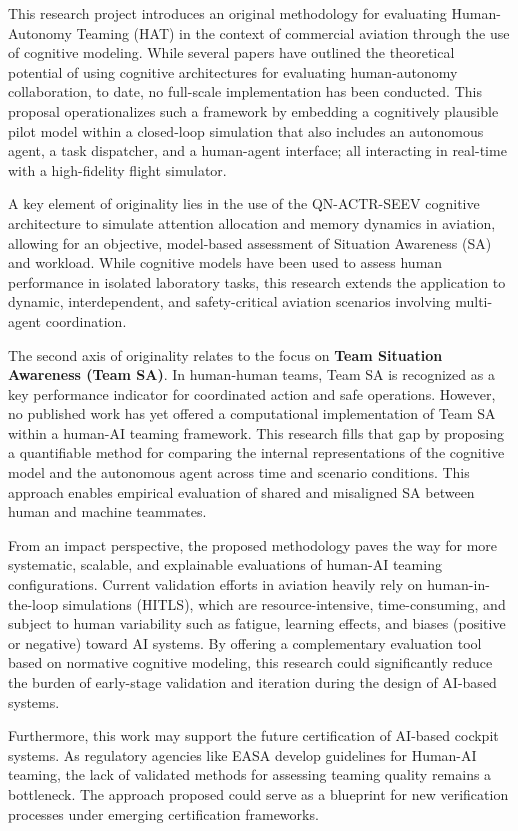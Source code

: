 \documentclass[12pt,a4paper]{article} %
\begin{document}
	This research project introduces an original methodology for evaluating Human-Autonomy Teaming (HAT) in the context of commercial aviation through the use of cognitive modeling. While several papers have outlined the theoretical potential of using cognitive architectures for evaluating human-autonomy collaboration, to date, no full-scale implementation has been conducted. This proposal operationalizes such a framework by embedding a cognitively plausible pilot model within a closed-loop simulation that also includes an autonomous agent, a task dispatcher, and a human-agent interface; all interacting in real-time with a high-fidelity flight simulator.
	
	A key element of originality lies in the use of the QN-ACTR-SEEV cognitive architecture to simulate attention allocation and memory dynamics in aviation, allowing for an objective, model-based assessment of Situation Awareness (SA) and workload. While cognitive models have been used to assess human performance in isolated laboratory tasks, this research extends the application to dynamic, interdependent, and safety-critical aviation scenarios involving multi-agent coordination.
	
	The second axis of originality relates to the focus on \textbf{Team Situation Awareness (Team SA)}. In human-human teams, Team SA is recognized as a key performance indicator for coordinated action and safe operations. However, no published work has yet offered a computational implementation of Team SA within a human-AI teaming framework. This research fills that gap by proposing a quantifiable method for comparing the internal representations of the cognitive model and the autonomous agent across time and scenario conditions. This approach enables empirical evaluation of shared and misaligned SA between human and machine teammates.
	
	From an impact perspective, the proposed methodology paves the way for more systematic, scalable, and explainable evaluations of human-AI teaming configurations. Current validation efforts in aviation heavily rely on human-in-the-loop simulations (HITLS), which are resource-intensive, time-consuming, and subject to human variability such as fatigue, learning effects, and biases (positive or negative) toward AI systems. By offering a complementary evaluation tool based on normative cognitive modeling, this research could significantly reduce the burden of early-stage validation and iteration during the design of AI-based systems.
	
	Furthermore, this work may support the future certification of AI-based cockpit systems. As regulatory agencies like EASA develop guidelines for Human-AI teaming, the lack of validated methods for assessing teaming quality remains a bottleneck. The approach proposed could serve as a blueprint for new verification processes under emerging certification frameworks.
	
\end{document}
